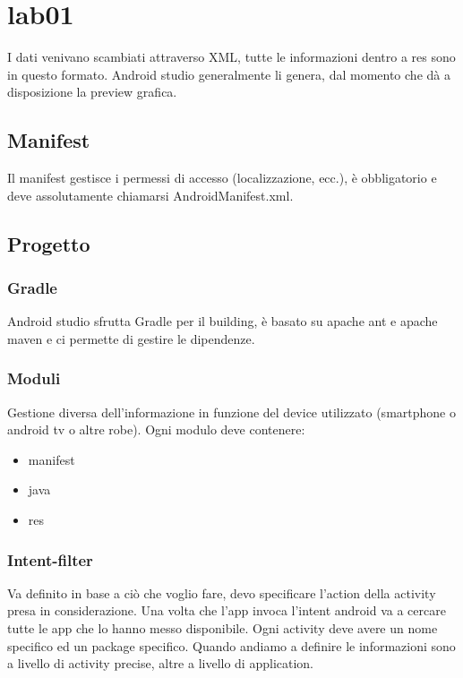 \chapter{lab01}
I dati venivano scambiati attraverso XML, tutte le informazioni dentro a res sono in questo formato. Android studio generalmente li genera, dal momento che dà a disposizione la preview grafica.

\section{Manifest}
Il manifest gestisce i permessi di accesso (localizzazione, ecc.), è obbligatorio e deve assolutamente chiamarsi AndroidManifest.xml. 

\section{Progetto}

\subsection{Gradle}

Android studio sfrutta Gradle per il building, è basato su apache ant e apache maven e ci permette di gestire le dipendenze.

\subsection{Moduli}
Gestione diversa dell'informazione in funzione del device utilizzato (smartphone o android tv o altre robe). Ogni modulo deve contenere: 
\begin{itemize}
	\item manifest
	\item java
	\item res
\end{itemize}

\subsection{Intent-filter}

Va definito in base a ciò che voglio fare, devo specificare l'action della activity presa in considerazione. Una volta che l'app invoca l'intent android va a cercare tutte le app che lo hanno messo disponibile. Ogni activity deve avere un nome specifico ed un package specifico. Quando andiamo a definire le informazioni sono a livello di activity precise, altre a livello di application. 